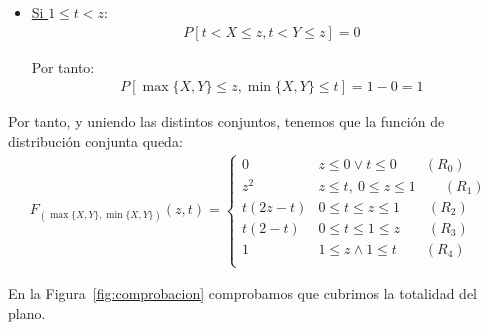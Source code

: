 \documentclass[12pt]{article}
\begin{document}
\begin{ejercicio}
\begin{enumerate}
\begin{itemize}
\begin{itemize}
\begin{itemize}
                        \item \ul{Si $1\leq t<z$}:
                        \begin{align*}
                            P[t<X\leq z,t<Y\leq z] = 0
                        \end{align*}

                        Por tanto:
                        \begin{align*}
                            P[\max\{X,Y\}\leq z, \min\{X,Y\}\leq t]
                            = 1- 0=1
                        \end{align*}
                    \end{itemize}
                \end{itemize}
            \end{itemize}

            Por tanto, y uniendo las distintos conjuntos, tenemos que la función de distribución conjunta queda:
            \begin{align*}
                F_{(\max\{X,Y\},\min\{X,Y\})}(z,t)
                = \begin{cases}
                    0 & z\leq 0 \lor t\leq 0 \qquad (R_0)\\
                    z^2 & z\leq t,~0\leq z\leq 1 \qquad (R_1)\\
                    t(2z-t) & 0\leq t\leq z\leq 1 \qquad (R_2)\\
                    t(2-t) & 0\leq t\leq 1\leq z \qquad (R_3)\\
                    1 & 1\leq z \land 1\leq t \qquad (R_4)\\
                \end{cases}
            \end{align*}

            En la Figura~\ref{fig:comprobacion} comprobamos que cubrimos la totalidad del plano.
            \begin{figure}[H]
                \centering
\end{figure}
\end{enumerate}
\end{ejercicio}
\end{document}
